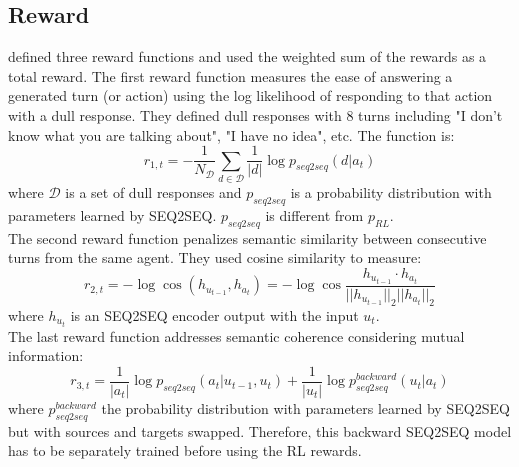 \subsection{Reward}
\cite{Li} defined three reward functions and used the weighted sum of the rewards as a total reward. The first reward function measures the ease of answering a generated turn (or action) using the log likelihood of responding to that action with a dull response. They defined dull responses with 8 turns including "I don't know what you are talking about", "I have no idea", etc. The function is:
\begin{equation}
	r_{1,t} = -\frac{1}{N_{\mathcal{D}}} \sum_{d\in \mathcal{D}} \frac{1}{|d|} \log p_{seq2seq}(d|a_t)
\end{equation} 
where $\mathcal{D}$ is a set of dull responses and $p_{seq2seq}$ is a probability distribution with parameters learned by SEQ2SEQ. $p_{seq2seq}$ is different from $p_{RL}$. \\
The second reward function penalizes semantic similarity between consecutive turns from the same agent. They used cosine similarity to measure:
\begin{equation}
	r_{2,t} = -\log \cos (h_{u_{t-1}}, h_{a_t}) = -\log \cos \frac{h_{u_{t-1}}\cdot h_{a_t}}{||h_{u_{t-1}}||_2 ||h_{a_t}||_2} \label{eq:reward2}
\end{equation}
where $h_{u_{t}}$ is an SEQ2SEQ encoder output with the input $u_t$. \\
The last reward function addresses semantic coherence considering mutual information:
\begin{equation}
r_{3,t} = \frac{1}{|a_t|} \log p_{seq2seq} (a_t|u_{t-1},u_t) + \frac{1}{|u_t|} \log p_{seq2seq}^{backward}(u_t|a_t) \label{eq:reward3}
\end{equation}
where $ p_{seq2seq}^{backward}$ the probability distribution with parameters learned by SEQ2SEQ but with sources and targets swapped. Therefore, this backward SEQ2SEQ model has to be separately trained before using the RL rewards. 

